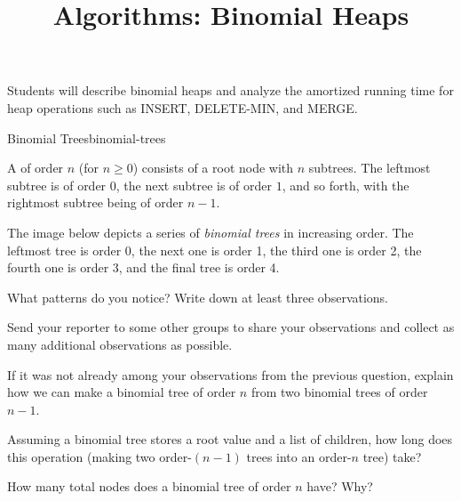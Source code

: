 \documentclass{tufte-handout}
\title{Algorithms: Binomial Heaps}
\date{}
\begin{document}
\maketitle

\begin{objective}
  Students will describe binomial heaps and analyze the amortized
  running time for heap operations such as INSERT, DELETE-MIN, and MERGE.
\end{objective}

\begin{model*}{Binomial Trees}{binomial-trees}
  \begin{defn}
    A  of order $n$ (for $n \geq 0$) consists of a root
    node with $n$ subtrees. The leftmost subtree is of order $0$,
    the next subtree is of order $1$, and so forth, with the
    rightmost subtree being of order $n-1$.
  \end{defn}

  The image below depicts a series of \emph{binomial trees} in
  increasing order. The leftmost tree is order 0, the next one is
  order 1, the third one is order 2, the fourth one is order 3, and
  the final tree is order 4.

  \begin{center}
  
  \end{center}
  \label{binomial-trees}
\end{model*}

\begin{questions}
\item What patterns do you notice?  Write down at least three
  observations.

\item Send your reporter to some other groups to share your
  observations and collect as many additional observations as possible.

\item If it was not already among your observations from the previous
  question, explain how we can make a binomial tree of order $n$ from
  two binomial trees of order $n - 1$. \label{binomial-merge}

\item Assuming a binomial tree stores a root value and a list of
  children, how long does this operation (making two order-$(n-1)$ trees
  into an order-$n$ tree) take?

\item How many total nodes does a binomial tree of order $n$ have?
  Why?
\end{questions}
\end{document}
